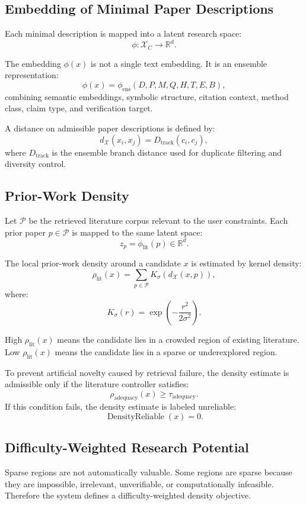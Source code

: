 \documentclass[11pt]{article}
\begin{document}
\subsection{Embedding of Minimal Paper Descriptions}
Each minimal description is mapped into a latent research space:
$$ \phi:\mathcal{X}_C\rightarrow \mathbb{R}^d. $$

The embedding $\phi(x)$ is not a single text embedding. It is an ensemble representation:
$$ \phi(x) = \phi_{\text{ens}}(D,P,M,Q,H,T,E,B), $$
combining semantic embeddings, symbolic structure, citation context, method class, claim type, and verification target.

A distance on admissible paper descriptions is defined by:
$$ d_{\mathcal{X}}(x_i,x_j) = D_{\text{track}}(c_i,c_j), $$
where $D_{\text{track}}$ is the ensemble branch distance used for duplicate filtering and diversity control.

\subsection{Prior-Work Density}
Let $\mathcal{P}$ be the retrieved literature corpus relevant to the user constraints. Each prior paper $p\in\mathcal{P}$ is mapped to the same latent space:
$$ z_p=\phi_{\text{lit}}(p)\in\mathbb{R}^d. $$

The local prior-work density around a candidate $x$ is estimated by kernel density:
$$ \rho_{\text{lit}}(x) = \sum_{p\in\mathcal{P}} K_{\sigma} \left( d_{\mathcal{X}}(x,p) \right), $$
where:
$$ K_{\sigma}(r) = \exp\left(-\frac{r^2}{2\sigma^2}\right). $$

High $\rho_{\text{lit}}(x)$ means the candidate lies in a crowded region of existing literature. Low $\rho_{\text{lit}}(x)$ means the candidate lies in a sparse or underexplored region.

To prevent artificial novelty caused by retrieval failure, the density estimate is admissible only if the literature controller satisfies:
$$ \rho_{\text{adequacy}}(x)\geq \tau_{\text{adequacy}}. $$
If this condition fails, the density estimate is labeled unreliable:
$$ \operatorname{DensityReliable}(x)=0. $$

\subsection{Difficulty-Weighted Research Potential}
Sparse regions are not automatically valuable. Some regions are sparse because they are impossible, irrelevant, unverifiable, or computationally infeasible. Therefore the system defines a difficulty-weighted density objective.
\end{document}
